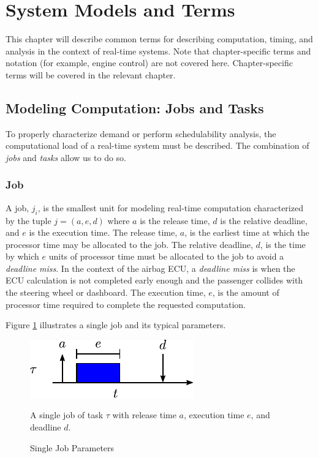 \section{System Models and Terms}   \label{chap:systemModel}

This chapter will describe common terms for describing computation, timing, and analysis in the context of real-time systems.
Note that chapter-specific terms and notation (for example, engine control) are not covered here.
Chapter-specific terms will be covered in the relevant chapter.

\subsection{Modeling Computation: Jobs and Tasks}

To properly characterize demand or perform schedulability analysis, the computational load of a real-time system must be described.
The combination of \textit{jobs} and \textit{tasks} allow us to do so.

\subsubsection{Job}

A job, $j_i$, is the smallest unit for modeling real-time computation characterized by the tuple $j = (a,e,d)$ where $a$ is the release time, $d$ is the relative deadline, and $e$ is the execution time.
The release time, $a$, is the earliest time at which the processor time may be allocated to the job.
The relative deadline, $d$, is the time by which $e$ units of processor time must be allocated to the job to avoid a \textit{deadline miss}.
In the context of the airbag ECU, a \textit{deadline miss} is when the ECU calculation is not completed early enough and the passenger collides with the steering wheel or dashboard. 
The execution time, $e$, is the amount of processor time required to complete the requested computation. 

Figure \ref{fig:rt-job} illustrates a single job and its typical parameters.

\begin{figure}
    \centering
    \includegraphics[width=0.50\linewidth]{fig/singleJob.pdf}
    \caption{Single Job Parameters} A single job of task $\tau$ with release time $a$, execution time $e$, and deadline $d$.
    \label{fig:rt-job}
\end{figure}

